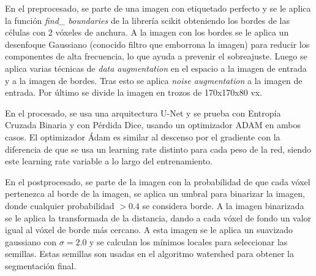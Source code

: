 
En el preprocesado, se parte de una imagen con etiquetado perfecto y se le aplica la función \textit{find\_ boundaries} de la librería scikit \cite{Pedregosa2011} \cite{Walt2014} obteniendo los bordes de las células con 2 vóxeles de anchura. A la imagen con los bordes se le aplica un desenfoque Gaussiano (conocido filtro que emborrona la imagen) para reducir los componentes de alta frecuencia, lo que ayuda a prevenir el sobreajuste. Luego se aplica varias técnicas de \textit{data augmentation} en el espacio a la imagen de entrada y a la imagen de bordes. Tras esto se aplica \textit{noise augmentation} a la imagen de entrada. Por último se divide la imagen en trozos de 170x170x80 vx.

En el procesado, se usa una arquitectura U-Net y se prueba con Entropía Cruzada Binaria y con Pérdida Dice, usando un optimizador ADAM en ambos casos. El optimizador Ádam es similar al descenso por el gradiente con la diferencia de que se usa un learning rate distinto para cada peso de la red, siendo este learning rate variable a lo largo del entrenamiento\cite{Kingma2017}.

En el postprocesado, se parte de la imagen con la probabilidad de que cada vóxel pertenezca al borde de la imagen, se aplica un umbral para binarizar la imagen, donde cualquier probabilidad $>0.4$ se considera borde. A la imagen binarizada se le aplica la transformada de la distancia, dando a cada vóxel de fondo un valor igual al vóxel de borde más cercano. A esta imagen se le aplica un suavizado gaussiano con $\sigma = 2.0$ y se calculan los mínimos locales para seleccionar las semillas. Estas semillas son usadas en el algoritmo watershed para obtener la segmentación final.

